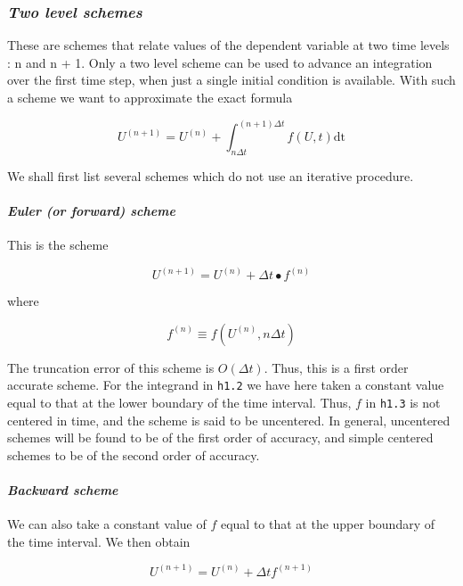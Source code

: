 \subsubsection{\texorpdfstring{\emph{Two level
schemes}}{Two level schemes}}\label{two-level-schemes}

These are schemes that relate values of the dependent variable at two
time levels : n and n + 1. Only a two level scheme can be used to
advance an integration over the first time step, when just a single
initial condition is available. With such a scheme we want to
approximate the exact formula

\[U^{( n + 1 )} = U^{\left( n \right)} + \int_{n\Delta t}^{(n+1)\Delta t}f\left( U,t \right)\text{dt}\]

We shall first list several schemes which do not use an iterative
procedure.

\paragraph{\texorpdfstring{\emph{Euler (or forward)
    scheme}}{Euler (or forward) scheme}}\label{euler-or-forward-scheme}

This is the scheme

\[U^{\left( n + 1 \right)} = U^{\left( n \right)} + \Delta t \bullet f^{\left( n \right)}\]

where

\[f^{\left( n \right)} \equiv f\left( U^{\left( n \right)},n\Delta t \right)\]

The truncation error of this scheme is \(O\left( \Delta t \right)\).
Thus, this is a first order accurate scheme. For the integrand in
\texttt{h1.2} we have here taken a constant value equal to that at the
lower boundary of the time interval. Thus, \(f\) in \texttt{h1.3} is not
centered in time, and the scheme is said to be uncentered. In general,
uncentered schemes will be found to be of the first order of accuracy,
and simple centered schemes to be of the second order of accuracy.

\paragraph{\texorpdfstring{\emph{Backward
scheme}}{Backward scheme}}\label{backward-scheme}

We can also take a constant value of \(f\) equal to that at the upper
boundary of the time interval. We then obtain

\[U^{( n + 1 )} = U^{( n )} + \Delta t  f^{\left( n + 1 \right)}\]

